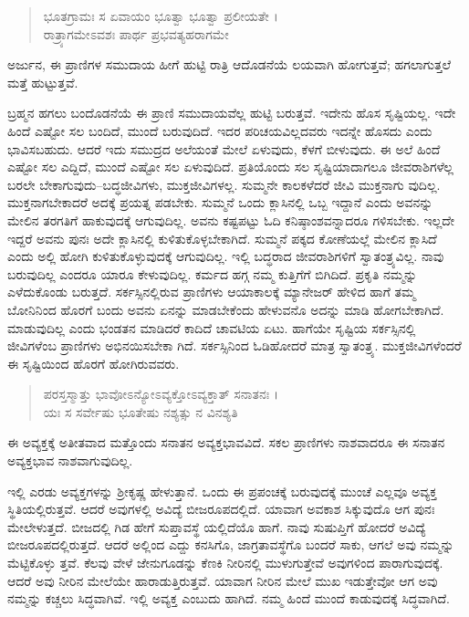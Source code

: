 \begin{verse}
ಭೂತಗ್ರಾಮಃ ಸ ಏವಾಯಂ ಭೂತ್ವಾ ಭೂತ್ವಾ ಪ್ರಲೀಯತೇ ।\\ರಾತ್ರ್ಯಾಗಮೇಽವಶಃ ಪಾರ್ಥ ಪ್ರಭವತ್ಯಹರಾಗಮೇ 
\end{verse}

{\small ಅರ್ಜುನ, ಈ ಪ್ರಾಣಿಗಳ ಸಮುದಾಯ ಹೀಗೆ ಹುಟ್ಟಿ ರಾತ್ರಿ ಆದೊಡನೆಯೆ ಲಯವಾಗಿ ಹೋಗುತ್ತವೆ; ಹಗಲಾಗುತ್ತಲೆ ಮತ್ತೆ ಹುಟ್ಟುತ್ತವೆ.}

ಬ್ರಹ್ಮನ ಹಗಲು ಬಂದೊಡನೆಯೆ ಈ ಪ್ರಾಣಿ ಸಮುದಾಯವೆಲ್ಲ ಹುಟ್ಟಿ ಬರುತ್ತವೆ. ಇದೇನು ಹೊಸ ಸೃಷ್ಟಿಯಲ್ಲ. ಇದೇ ಹಿಂದೆ ಎಷ್ಟೋ ಸಲ ಬಂದಿದೆ, ಮುಂದೆ ಬರುವುದಿದೆ. ಇದರ ಪರಿಚಯವಿಲ್ಲದವರು ಇದನ್ನೇ ಹೊಸದು ಎಂದು ಭಾವಿಸಬಹುದು. ಆದರೆ ಇದು ಸಮುದ್ರದ ಅಲೆಯಂತೆ ಮೇಲೆ ಏಳುವುದು, ಕೆಳಗೆ ಬೀಳುವುದು. ಈ ಅಲೆ ಹಿಂದೆ ಎಷ್ಟೋ ಸಲ ಎದ್ದಿದೆ, ಮುಂದೆ ಎಷ್ಟೋ ಸಲ ಏಳುವುದಿದೆ. ಪ್ರತಿಯೊಂದು ಸಲ ಸೃಷ್ಟಿಯಾದಾಗಲೂ ಜೀವರಾಶಿಗಳೆಲ್ಲ ಬರಲೇ ಬೇಕಾಗುವುದು–ಬದ್ಧಜೀವಿಗಳು, ಮುಕ್ತಜೀವಿಗಳಲ್ಲ. ಸುಮ್ಮನೇ ಕಾಲಕಳೆದರೆ ಜೀವಿ ಮುಕ್ತನಾಗು ವುದಿಲ್ಲ. ಮುಕ್ತನಾಗಬೇಕಾದರೆ ಅದಕ್ಕೆ ಪ್ರಯತ್ನ ಪಡಬೇಕು. ಸುಮ್ಮನೆ ಒಂದು ಕ್ಲಾಸಿನಲ್ಲಿ ಒಬ್ಬ ಇದ್ದಾನೆ ಎಂದು ಅವನನ್ನು ಮೇಲಿನ ತರಗತಿಗೆ ಹಾಕುವುದಕ್ಕೆ ಆಗುವುದಿಲ್ಲ. ಅವನು ಕಷ್ಟಪಟ್ಟು ಓದಿ ಕನಿಷ್ಠಾಂಶವನ್ನಾದರೂ ಗಳಿಸಬೇಕು. ಇಲ್ಲದೇ ಇದ್ದರೆ ಅವನು ಪುನಃ ಅದೇ ಕ್ಲಾಸಿನಲ್ಲಿ ಕುಳಿತುಕೊಳ್ಳಬೇಕಾಗಿದೆ. ಸುಮ್ಮನೆ ಪಕ್ಕದ ಕೋಣೆಯಲ್ಲೆ ಮೇಲಿನ ಕ್ಲಾಸಿದೆ ಎಂದು ಅಲ್ಲಿ ಹೋಗಿ ಕುಳಿತುಕೊಳ್ಳುವುದಕ್ಕೆ ಆಗುವುದಿಲ್ಲ. ಇಲ್ಲಿ ಬದ್ಧರಾದ ಜೀವರಾಶಿಗಳಿಗೆ ಸ್ವಾತಂತ್ರ್ಯವಿಲ್ಲ. ನಾವು ಬರುವುದಿಲ್ಲ ಎಂದರೂ ಯಾರೂ ಕೇಳುವುದಿಲ್ಲ. ಕರ್ಮದ ಹಗ್ಗ ನಮ್ಮ ಕುತ್ತಿಗೆಗೆ ಬಿಗಿದಿದೆ. ಪ್ರಕೃತಿ ನಮ್ಮನ್ನು ಎಳೆದುಕೊಂಡು ಬರುತ್ತದೆ. ಸರ್ಕಸ್ಸಿನಲ್ಲಿರುವ ಪ್ರಾಣಿಗಳು ಆಯಾಕಾಲಕ್ಕೆ ಮ್ಯಾನೇಜರ್ ಹೇಳಿದ ಹಾಗೆ ತಮ್ಮ ಬೋನಿನಿಂದ ಹೊರಗೆ ಬಂದು ಅವನು ಏನನ್ನು ಮಾಡಬೇಕೆಂದು ಹೇಳುವನೊ ಅದನ್ನು ಮಾಡಿ ಹೋಗಬೇಕಾಗಿದೆ. ಮಾಡುವುದಿಲ್ಲ ಎಂದು ಭಂಡತನ ಮಾಡಿದರೆ ಕಾದಿದೆ ಚಾವಟಿಯ ಏಟು. ಹಾಗೆಯೇ ಸೃಷ್ಟಿಯ ಸರ್ಕಸ್ಸಿನಲ್ಲಿ ಜೀವಿಗಳೆಂಬ ಪ್ರಾಣಿಗಳು ಅಭಿನಯಿಸಬೇಕಾ ಗಿದೆ. ಸರ್ಕಸ್ಸಿನಿಂದ ಓಡಿಹೋದರೆ ಮಾತ್ರ ಸ್ವಾತಂತ್ರ್ಯ. ಮುಕ್ತಜೀವಿಗಳೆಂದರೆ ಈ ಸೃಷ್ಟಿಯಿಂದ ಹೊರಗೆ ಹೋಗಿರುವವರು.

\begin{verse}
ಪರಸ್ತಸ್ಮಾತ್ತು ಭಾವೋಽನ್ಯೋಽವ್ಯಕ್ತೋಽವ್ಯಕ್ತಾತ್ ಸನಾತನಃ ।\\ಯಃ ಸ ಸರ್ವೇಷು ಭೂತೇಷು ನಶ್ಯತ್ಸು ನ ವಿನಶ್ಯತಿ 
\end{verse}

{\small ಈ ಅವ್ಯಕ್ತಕ್ಕೆ ಅತೀತವಾದ ಮತ್ತೊಂದು ಸನಾತನ ಅವ್ಯಕ್ತಭಾವವಿದೆ. ಸಕಲ ಪ್ರಾಣಿಗಳು ನಾಶವಾದರೂ ಈ ಸನಾತನ ಅವ್ಯಕ್ತಭಾವ ನಾಶವಾಗುವುದಿಲ್ಲ.}

ಇಲ್ಲಿ ಎರಡು ಅವ್ಯಕ್ತಗಳನ್ನು ಶ್ರೀಕೃಷ್ಣ ಹೇಳುತ್ತಾನೆ. ಒಂದು ಈ ಪ್ರಪಂಚಕ್ಕೆ ಬರುವುದಕ್ಕೆ ಮುಂಚೆ ಎಲ್ಲವೂ ಅವ್ಯಕ್ತ ಸ್ಥಿತಿಯಲ್ಲಿರುತ್ತವೆ. ಆದರೆ ಅವುಗಳಲ್ಲಿ ಅವಿದ್ಯೆ ಬೀಜರೂಪದಲ್ಲಿದೆ. ಯಾವಾಗ ಅವಕಾಶ ಸಿಕ್ಕುವುದೊ ಆಗ ಪುನಃ ಮೇಲೇಳುತ್ತದೆ. ಬೀಜದಲ್ಲಿ ಗಿಡ ಹೇಗೆ ಸುಪ್ತಾವಸ್ಥೆ ಯಲ್ಲಿದೆಯೊ ಹಾಗೆ. ನಾವು ಸುಷುಪ್ತಿಗೆ ಹೋದರೆ ಅವಿದ್ಯೆ ಬೀಜರೂಪದಲ್ಲಿರುತ್ತದೆ. ಆದರೆ ಅಲ್ಲಿಂದ ಎದ್ದು ಕನಸಿಗೊ, ಜಾಗ್ರತಾವಸ್ಥೆಗೊ ಬಂದರೆ ಸಾಕು, ಆಗಲೆ ಅವು ನಮ್ಮನ್ನು ಮೆಟ್ಟಿಕೊಳ್ಳು ತ್ತವೆ. ಕೆಲವು ವೇಳೆ ಜೇನುಗೂಡನ್ನು ಕೆಣಕಿ ನೀರಿನಲ್ಲಿ ಮುಳುಗುತ್ತೇವೆ ಅವುಗಳಿಂದ ಪಾರಾಗುವುದಕ್ಕೆ. ಆದರೆ ಅವು ನೀರಿನ ಮೇಲೆಯೇ ಹಾರಾಡುತ್ತಿರುತ್ತವೆ. ಯಾವಾಗ ನೀರಿನ ಮೇಲೆ ಮುಖ ಇಡುತ್ತೇವೋ ಆಗ ಅವು ನಮ್ಮನ್ನು ಕಚ್ಚಲು ಸಿದ್ಧವಾಗಿವೆ. ಇಲ್ಲಿ ಅವ್ಯಕ್ತ ಎಂಬುದು ಹಾಗಿದೆ. ನಮ್ಮ ಹಿಂದೆ ಮುಂದೆ ಕಾಡುವುದಕ್ಕೆ ಸಿದ್ಧವಾಗಿದೆ.

